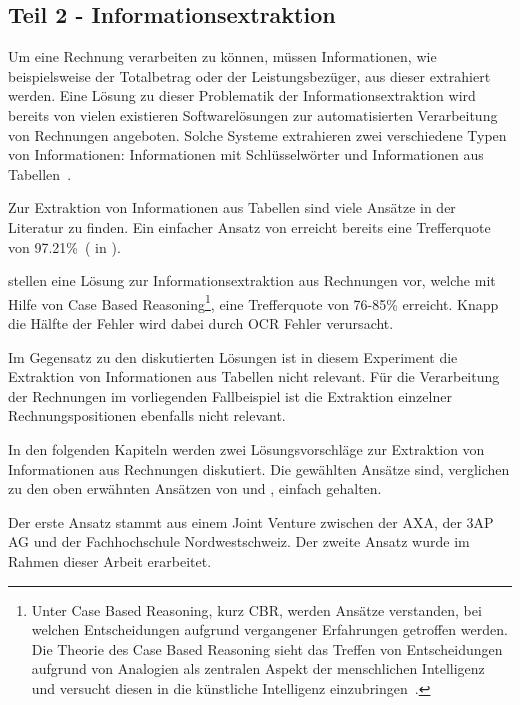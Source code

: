 \subsection{Teil 2 - Informationsextraktion}
\label{chap:ie}



Um eine Rechnung verarbeiten zu können, müssen Informationen, wie beispielsweise der Totalbetrag oder der Leistungsbezüger, aus dieser extrahiert werden. Eine Lösung zu dieser Problematik der Informationsextraktion wird bereits von vielen existieren Softwarelösungen zur automatisierten Verarbeitung von Rechnungen angeboten. Solche Systeme extrahieren zwei verschiedene Typen von Informationen: Informationen mit Schlüsselwörter und Informationen aus Tabellen~\autocite{Hamza}.

Zur Extraktion von Informationen aus Tabellen sind viele Ansätze in der Literatur zu finden. Ein einfacher Ansatz von \textcite{Mandal} erreicht bereits eine Trefferquote von 97.21\%~(\cite{Mandal} in \cite{Hamza}).

\textcite{Hamza} stellen eine Lösung zur Informationsextraktion aus Rechnungen vor, welche mit Hilfe von Case Based Reasoning\footnote{Unter Case Based Reasoning, kurz CBR, werden Ansätze verstanden, bei welchen Entscheidungen aufgrund vergangener Erfahrungen getroffen werden. Die Theorie des Case Based Reasoning sieht das Treffen von Entscheidungen aufgrund von Analogien als zentralen Aspekt der menschlichen Intelligenz und versucht diesen in die künstliche Intelligenz einzubringen~\autocite{CBR}.}, eine Trefferquote von 76-85\% erreicht. Knapp die Hälfte der Fehler wird dabei durch OCR Fehler verursacht.

Im Gegensatz zu den diskutierten Lösungen ist in diesem Experiment die Extraktion von Informationen aus Tabellen nicht relevant. Für die Verarbeitung der Rechnungen im vorliegenden Fallbeispiel ist die Extraktion einzelner Rechnungspositionen ebenfalls nicht relevant.

In den folgenden Kapiteln werden zwei Lösungsvorschläge zur Extraktion von Informationen aus Rechnungen diskutiert. Die gewählten Ansätze sind, verglichen zu den oben erwähnten Ansätzen von \textcite{Mandal} und \textcite{Hamza}, einfach gehalten. 

Der erste Ansatz stammt aus einem Joint Venture zwischen der AXA, der 3AP AG und der Fachhochschule Nordwestschweiz. Der zweite Ansatz wurde im Rahmen dieser Arbeit erarbeitet.


